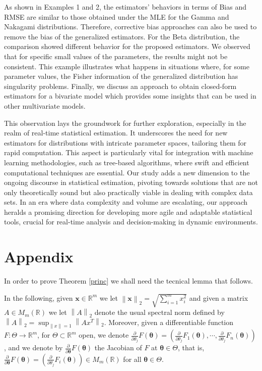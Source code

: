 \documentclass[12pt]{article} %
\newcommand{\R}{\mathbb{R}}
\newcommand{\bs}{\boldsymbol}
\theoremstyle{definition}
\begin{document}
As shown in Examples 1 and 2, the estimators' behaviors in terms of Bias and RMSE are similar to those obtained under the MLE for the Gamma and Nakagami distributions. Therefore, corrective bias approaches can also be used to remove the bias of the generalized estimators. For the Beta distribution, the comparison showed different behavior for the proposed estimators. We observed that for specific small values of the parameters, the results might not be consistent. This example illustrates what happens in situations where, for some parameter values, the Fisher information of the generalized distribution has singularity problems. Finally, we discuss an approach to obtain closed-form estimators for a bivariate model which provides some insights that can be used in other multivariate models.



This observation lays the groundwork for further exploration, especially in the realm of real-time statistical estimation. It underscores the need for new estimators for distributions with intricate parameter spaces, tailoring them for rapid computation. This aspect is particularly vital for integration with machine learning methodologies, such as tree-based algorithms, where swift and efficient computational techniques are essential. Our study adds a new dimension to the ongoing discourse in statistical estimation, pivoting towards solutions that are not only theoretically sound but also practically viable in dealing with complex data sets. In an era where data complexity and volume are escalating, our approach heralds a promising direction for developing more agile and adaptable statistical tools, crucial for real-time analysis and decision-making in dynamic environments.

	





\appendix


	\section*{Appendix}



In order to prove Theorem \ref{princ} we shall need the tecnical lemma that follows.

In the following, given $\bs{x}\in \R^m$ we let $\left\|\bs{x}\right\|_2=\sqrt{\sum_{i=1}^m x_i^2}$ and given a matrix $A\in M_m(\R)$ we let $\left\|A\right\|_2$ denote the usual spectral norm defined by $\left\|A\right\|_2=\sup_{\left\|x\right\|=1}\left\|Ax^T\right\|_2$. Moreover, given a differentiable function $F:\Theta\to \mathbb{R}^m$, for $\Theta\subset \mathbb{R}^m$ open, we denote $\frac{\partial}{\partial \theta_j} F(\bs{\theta})=\left(\frac{\partial}{\partial \theta_j} F_1 (\bs{\theta}),\cdots,  \frac{\partial}{\partial \theta_j} F_n (\bs{\theta})\right)$, and we denote
 by $\frac{\partial}{\partial \bs{\theta}} F(\bs{\theta})$ the Jacobian of $F$ at $\bs{\theta}\in \Theta$, that is, $\frac{\partial}{\partial \bs{\theta}} F(\bs{\theta})=\left(\frac{\partial}{\partial \theta_j} F_i (\bs{\theta})\right)\in M_m(\mathbb{R})$ for all $\bs{\theta}\in \Theta$.
 
\end{document}
